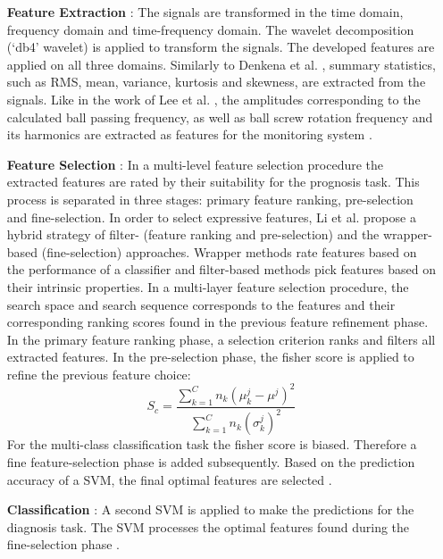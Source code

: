 \begin{itemize}
    \item [\textbf{Feature Extraction}]: The signals are transformed in the time domain, frequency domain and time-frequency domain. The wavelet decomposition (‘db4’ wavelet) is applied to transform the signals. The developed features are applied on all three domains. Similarly to Denkena et al. \cite{Denkena2021}, summary statistics, such as RMS, mean, variance, kurtosis and skewness, are extracted from the signals. Like in the work of Lee et al. \cite{Lee2015}, the amplitudes corresponding to the calculated ball passing frequency, as well as ball screw rotation frequency and its harmonics are extracted as features for the monitoring system \cite{LiPin2018}.
    \item [\textbf{Feature Selection}]: In a multi-level feature selection procedure the extracted features are rated by their suitability for the prognosis task. This process is separated in three stages: primary feature ranking, pre-selection and fine-selection. In order to select expressive features, Li et al. \cite{LiPin2018} propose a hybrid strategy of filter- (feature ranking and pre-selection) and the wrapper-based (fine-selection) approaches. Wrapper methods rate features based on the performance of a classifier and filter-based methods pick features based on their intrinsic properties. In a multi-layer feature selection procedure, the search space and search sequence corresponds to the features and their corresponding ranking scores found in the previous feature refinement phase. In the primary feature ranking phase, a selection criterion ranks and filters all extracted features. In the pre-selection phase, the fisher score is applied to refine the previous feature choice:
    \begin{equation}
        S_{c} = \frac{\sum_{k=1}^{C} n_{k}(\mu_{k}^{j}-\mu^{j})^{2}}{\sum_{k=1}^{C}n_{k}(\sigma_{k}^{j})^{2}}
    \end{equation}
    For the multi-class classification task the fisher score is biased. Therefore a fine feature-selection phase is added subsequently. Based on the prediction accuracy of a SVM, the final optimal features are selected \cite{LiPin2018}.
    \item [\textbf{Classification}]: A second SVM is applied to make the predictions for the diagnosis task. The SVM processes the optimal features found during the fine-selection phase \cite{LiPin2018}. 
\end{itemize}


